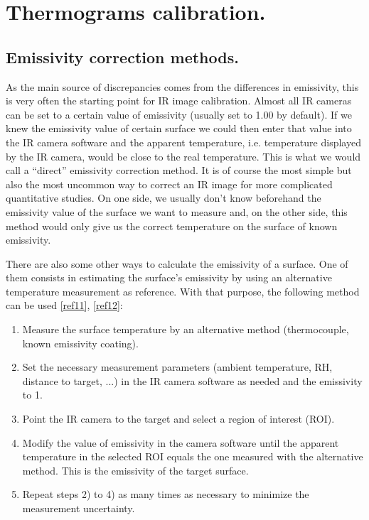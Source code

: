 \pagestyle{standard}

\chapter{Thermograms calibration.}\label{chapter4}

	\thispagestyle{chapter-first-page}

	\section{Emissivity correction methods. }\label{section4.1}
		
		As the main source of discrepancies comes from the differences in emissivity, this is very often the starting point for IR image calibration. Almost all IR cameras can be set to a certain value of emissivity (usually set to 1.00 by default). If we knew the emissivity value of certain surface we could then enter that value into the IR camera software and the apparent temperature, i.e. temperature displayed by the IR camera, would be close to the real temperature. This is what we would call a “direct” emissivity correction method. It is of course the most simple but also the most uncommon way to correct an IR image for more complicated quantitative studies. On one side, we usually don’t know beforehand the emissivity value of the surface we want to measure and, on the other side, this method would only give us the correct temperature on the surface of known emissivity.
		
		There are also some other ways to calculate the emissivity of a surface. One of them consists in estimating the surface’s emissivity by using an alternative temperature measurement as reference. With that purpose, the following method can be used  \ref{ref11}, \ref{ref12}:
		
		\begin{enumerate}[label={\arabic*)}]
			\item Measure the surface temperature by an alternative method (thermocouple, known emissivity coating).
			\item Set the necessary measurement parameters (ambient temperature, RH, distance to target, ...) in the IR camera software as needed and the emissivity to 1.
			\item Point the IR camera to the target and select a region of interest (ROI).
			\item Modify the value of emissivity in the camera software until the apparent temperature in the selected ROI equals the one measured with the alternative method. This is the emissivity of the target surface.
			\item Repeat steps 2) to 4) as many times as necessary to minimize the measurement uncertainty.
		\end{enumerate}
		

